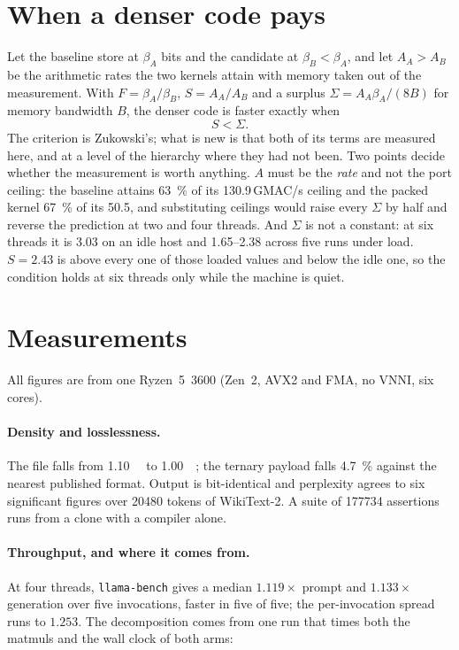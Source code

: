 \documentclass[11pt,a4paper]{article}
\newcommand{\code}[1]{\texttt{#1}}
\begin{document}
\section{When a denser code pays}\label{sec:condition}

Let the baseline store at $\beta_{A}$ bits and the candidate at
$\beta_{B}<\beta_{A}$, and let $A_{A}>A_{B}$ be the arithmetic rates the two
kernels attain with memory taken out of the measurement. With
$F=\beta_{A}/\beta_{B}$, $S=A_{A}/A_{B}$ and a surplus
$\Sigma=A_{A}\beta_{A}/(8B)$ for memory bandwidth $B$, the denser code is faster
exactly when
\begin{equation}
S<\Sigma .
\label{eq:condition}
\end{equation}
The criterion is Zukowski's; what is new is that both of its terms are measured
here, and at a level of the hierarchy where they had not been. Two points
decide whether the measurement is worth anything. $A$ must be the \emph{rate}
and not the port ceiling: the baseline attains \SI{63}{\percent} of its
\num{130.9}\,GMAC/s ceiling and the packed kernel \SI{67}{\percent} of its
\num{50.5}, and substituting ceilings would raise every $\Sigma$ by half and
reverse the prediction at two and four threads. And $\Sigma$ is not a constant:
at six threads it is \num{3.03} on an idle host and \numrange{1.65}{2.38}
across five runs under load. $S=\num{2.43}$ is above every one of those loaded
values and below the idle one, so the condition holds at six threads only while
the machine is quiet.

\section{Measurements}\label{sec:results}

All figures are from one Ryzen~5~3600 (Zen~2, AVX2 and FMA, no VNNI, six cores).

\paragraph{Density and losslessness.} The file falls from
\SI{1.10}{\gibi\byte} to \SI{1.00}{\gibi\byte}; the ternary payload falls
\SI{4.7}{\percent} against the nearest published format. Output is
bit-identical and perplexity agrees to six significant figures over
\num{20480} tokens of WikiText-2. A suite of \num{177734} assertions runs from
a clone with a compiler alone.

\paragraph{Throughput, and where it comes from.} At four threads,
\code{llama-bench} gives a median $\num{1.119}\times$ prompt and
$\num{1.133}\times$ generation over five invocations, faster in five of five;
the per-invocation spread runs to $\num{1.253}$. The decomposition comes from one run that times both the matmuls and
the wall clock of both arms:
\end{document}
